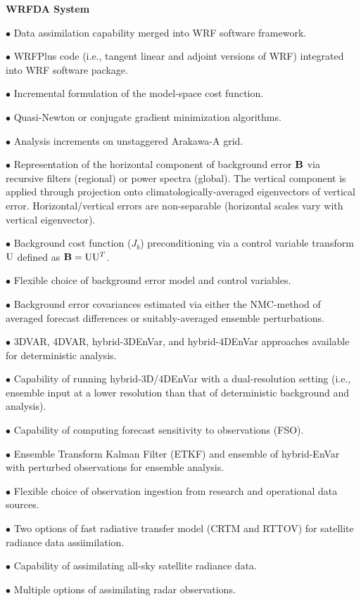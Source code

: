 \vskip 12pt
{\noindent\bf WRFDA System}
\vskip 12pt

\begin{description}
\setlength{\itemsep}{-5pt}
\item{$\bullet$} Data assimilation capability merged into WRF software framework.
%
\item{$\bullet$} WRFPlus code (i.e., tangent linear and adjoint versions of WRF) integrated into WRF software package.
%
\item{$\bullet$} Incremental formulation of the model-space cost function.
%
\item{$\bullet$} Quasi-Newton or conjugate gradient minimization algorithms.
%
\item{$\bullet$} Analysis increments on unstaggered Arakawa-A grid.
%
\item{$\bullet$} Representation of the horizontal component of background 
error ${\bf B}$ via recursive filters (regional) or power spectra (global). The
vertical component is applied through projection onto climatologically-averaged 
eigenvectors of vertical error. Horizontal/vertical errors are
non-separable (horizontal scales vary with vertical eigenvector).
%
\item{$\bullet$}  Background cost function ($J_b$) preconditioning 
via a control variable transform ${\rm U}$ defined as ${\bf B}={\rm U} {\rm U}^T$.
%
\item{$\bullet$} Flexible choice of background error model and control variables.
%
\item{$\bullet$} Background error covariances estimated via either the
NMC-method of averaged forecast differences or suitably-averaged
ensemble perturbations.
%
\item{$\bullet$} 3DVAR, 4DVAR, hybrid-3DEnVar, and hybrid-4DEnVar approaches available for deterministic analysis. 
%
\item{$\bullet$} Capability of running hybrid-3D/4DEnVar with a dual-resolution setting (i.e., ensemble input at a lower resolution than that of deterministic background and analysis).
%
\item{$\bullet$} Capability of computing forecast sensitivity to observations (FSO).
%
\item{$\bullet$} Ensemble Transform Kalman Filter (ETKF) and ensemble of hybrid-EnVar with perturbed observations for ensemble analysis. 
%
\item{$\bullet$} Flexible choice of observation ingestion from research and operational data sources. 
%
\item{$\bullet$} Two options of fast radiative transfer model (CRTM and RTTOV) for satellite radiance data assiimilation. 
%
\item{$\bullet$} Capability of assimilating all-sky satellite radiance data. 
%
\item{$\bullet$} Multiple options of assimilating radar observations.
%
\end{description}


